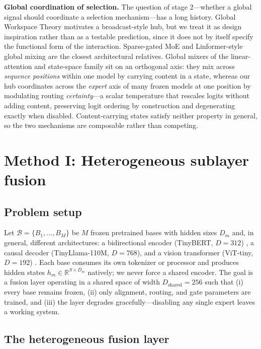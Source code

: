 \documentclass[10pt]{article}
\newcommand{\R}{\mathbb{R}}
\theoremstyle{definition}
\theoremstyle{plain}
\theoremstyle{remark}
\begin{document}
\textbf{Global coordination of selection.} The question of stage 2---whether a global signal should coordinate a selection mechanism---has a long history. Global Workspace Theory \citep{baarsCognitiveTheoryConsciousness1988} motivates a broadcast-style hub, but we treat it as design inspiration rather than as a testable prediction, since it does not by itself specify the functional form of the interaction. Sparse-gated MoE \citep{shazeerOutrageouslyLargeNeural2017} and Linformer-style global mixing \citep{wangLinformerSelfAttentionLinear2020} are the closest architectural relatives. Global mixers of the linear-attention and state-space family \citep{katharopoulos2020,gu2022s4,gu2023mamba} sit on an orthogonal axis: they mix across \emph{sequence positions} within one model by carrying content in a state, whereas our hub coordinates across the \emph{expert} axis of many frozen models at one position by modulating routing \emph{certainty}---a scalar temperature that rescales logits without adding content, preserving logit ordering by construction and degenerating exactly when disabled. Content-carrying states satisfy neither property in general, so the two mechanisms are composable rather than competing.

\section{Method I: Heterogeneous sublayer fusion}
\label{sec:method}

\subsection{Problem setup}
\label{sec:setup}

Let $\mathcal{B} = \{B_1, \dots, B_M\}$ be $M$ frozen pretrained bases with hidden sizes $D_m$ and, in general, different architectures: a bidirectional encoder (TinyBERT, $D{=}312$) \citep{jiao2020,devlin2019}, a causal decoder (TinyLlama-110M, $D{=}768$), and a vision transformer (ViT-tiny, $D{=}192$) \citep{dosovitskiy2021}. Each base consumes its own tokenizer or processor and produces hidden states $h_m \in \R^{S \times D_m}$ natively; we never force a shared encoder. The goal is a fusion layer operating in a shared space of width $D_{\text{shared}} = 256$ such that (i) every base remains frozen, (ii) only alignment, routing, and gate parameters are trained, and (iii) the layer degrades gracefully---disabling any single expert leaves a working system.

\subsection{The heterogeneous fusion layer}
\label{sec:layer}
\end{document}
